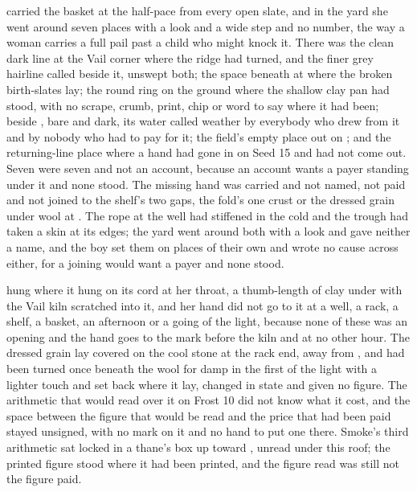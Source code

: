  carried the basket at the half-pace from every open slate, and in the yard she went around seven places with a look and a wide step and no number, the way a woman carries a full pail past a child who might knock it. There was the clean dark line at the Vail corner where the  ridge had turned, and the finer grey hairline called  beside it, unswept both; the space beneath  at  where the broken birth-slates lay; the round ring on the ground where the shallow clay pan had stood, with no scrape, crumb, print, chip or word to say where it had been;  beside , bare and dark, its water called weather by everybody who drew from it and by nobody who had to pay for it; the field's empty place out on ; and the returning-line place where a hand had gone in on Seed 15 and had not come out. Seven were seven and not an account, because an account wants a payer standing under it and none stood. The missing hand was carried and not named, not paid and not joined to the shelf's two gaps, the fold's one crust or the dressed grain under wool at . The rope at the well had stiffened in the cold and the trough had taken a skin at its edges; the yard went around both with a look and gave neither a name, and the boy set them on places of their own and wrote no cause across either, for a joining would want a payer and none stood.

 hung where it hung on its cord at her throat, a thumb-length of clay under  with the Vail kiln scratched into it, and her hand did not go to it at a well, a rack, a shelf, a basket, an afternoon or a going of the light, because none of these was an opening and the hand goes to the mark before the kiln and at no other hour. The dressed grain lay covered on the cool stone at the rack end, away from , and had been turned once beneath the wool for damp in the first of the light with a lighter touch and set back where it lay, changed in state and given no figure. The arithmetic that would read over it on Frost 10 did not know what it cost, and the space between the figure that would be read and the price that had been paid stayed unsigned, with no mark on it and no hand to put one there. Smoke's third arithmetic sat locked in a thane's box up  toward , unread under this roof; the printed figure stood where it had been printed, and the figure read was still not the figure paid.

